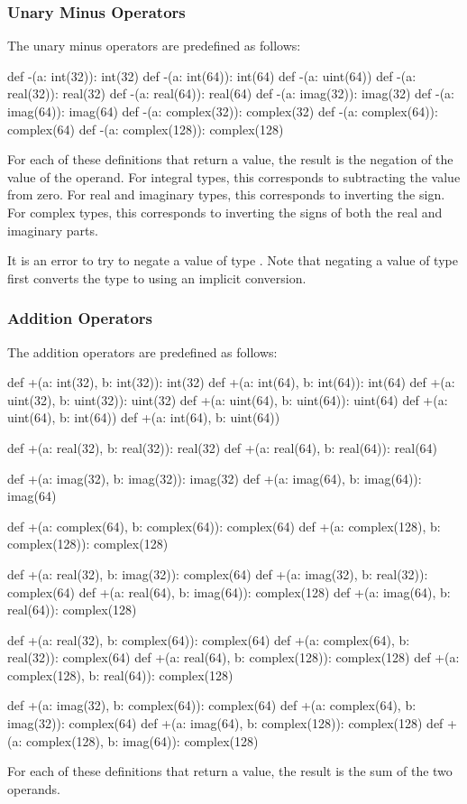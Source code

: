 \subsubsection{Unary Minus Operators}
\label{Unary_Minus_Operators}

The unary minus operators are predefined as follows:
\begin{chapel}
def -(a: int(32)): int(32)
def -(a: int(64)): int(64)
def -(a: uint(64))
def -(a: real(32)): real(32)
def -(a: real(64)): real(64)
def -(a: imag(32)): imag(32)
def -(a: imag(64)): imag(64)
def -(a: complex(32)): complex(32)
def -(a: complex(64)): complex(64)
def -(a: complex(128)): complex(128)
\end{chapel}
For each of these definitions that return a value, the result is the
negation of the value of the operand.  For integral types, this
corresponds to subtracting the value from zero.  For real and
imaginary types, this corresponds to inverting the sign.  For complex
types, this corresponds to inverting the signs of both the real and
imaginary parts.

It is an error to try to negate a value of type .  Note
that negating a value of type  first converts the type
to  using an implicit conversion.

\subsubsection{Addition Operators}
\label{Addition_Operators}

The addition operators are predefined as follows:
\begin{chapel}
def +(a: int(32), b: int(32)): int(32)
def +(a: int(64), b: int(64)): int(64)
def +(a: uint(32), b: uint(32)): uint(32)
def +(a: uint(64), b: uint(64)): uint(64)
def +(a: uint(64), b: int(64))
def +(a: int(64), b: uint(64))

def +(a: real(32), b: real(32)): real(32)
def +(a: real(64), b: real(64)): real(64)

def +(a: imag(32), b: imag(32)): imag(32)
def +(a: imag(64), b: imag(64)): imag(64)

def +(a: complex(64), b: complex(64)): complex(64)
def +(a: complex(128), b: complex(128)): complex(128)

def +(a: real(32), b: imag(32)): complex(64)
def +(a: imag(32), b: real(32)): complex(64)
def +(a: real(64), b: imag(64)): complex(128)
def +(a: imag(64), b: real(64)): complex(128)

def +(a: real(32), b: complex(64)): complex(64)
def +(a: complex(64), b: real(32)): complex(64)
def +(a: real(64), b: complex(128)): complex(128)
def +(a: complex(128), b: real(64)): complex(128)

def +(a: imag(32), b: complex(64)): complex(64)
def +(a: complex(64), b: imag(32)): complex(64)
def +(a: imag(64), b: complex(128)): complex(128)
def +(a: complex(128), b: imag(64)): complex(128)
\end{chapel}
For each of these definitions that return a value, the result is the
sum of the two operands.

